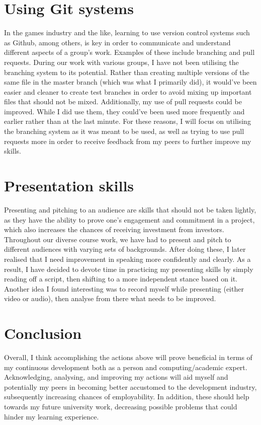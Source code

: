 \documentclass{scrartcl}
\begin{document}
\section{Using Git systems}
In the games industry and the like, learning to use version control systems such as Github, among others, is key in order to communicate and understand different aspects of a group's work. Examples of these include branching and pull requests. During our work with various groups, I have not been utilising the branching system to its potential. Rather than creating multiple versions of the same file in the master branch (which was what I primarily did), it would've been easier and cleaner to create test branches in order to avoid mixing up important files that should not be mixed. Additionally, my use of pull requests could be improved. While I did use them, they could've been used more frequently and earlier rather than at the last minute. For these reasons, I will focus on utilising the branching system as it was meant to be used, as well as trying to use pull requests more in order to receive feedback from my peers to further improve my skills. 

\section{Presentation skills}
Presenting and pitching to an audience are skills that should not be taken lightly, as they have the ability to prove one's engagement and commitment in a project, which also increases the chances of receiving investment from investors. Throughout our diverse course work, we have had to present and pitch to different audiences with varying sets of backgrounds. After doing these, I later realised that I need improvement in speaking more confidently and clearly. As a result, I have decided to devote time in practicing my presenting skills by simply reading off a script, then shifting to a more independent stance based on it. Another idea I found interesting was to record myself while presenting (either video or audio), then analyse from there what needs to be improved. 

\section{Conclusion}
Overall, I think accomplishing the actions above will prove beneficial in terms of my continuous development both as a person and computing/academic expert. Acknowledging, analysing, and improving my actions will aid myself and potentially my peers in becoming better accustomed to the development industry, subsequently increasing chances of employability. In addition, these should help towards my future university work, decreasing possible problems that could hinder my learning experience.   
\end{document}
